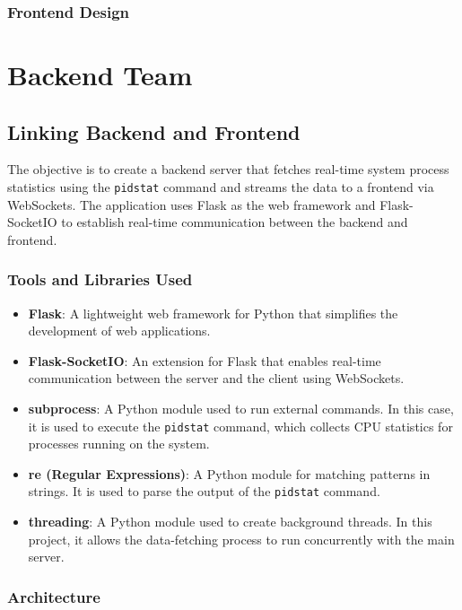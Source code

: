 \documentclass[12pt]{article}
\begin{document}
\subsubsection{Frontend Design}
\section{Backend Team}
\subsection{Linking Backend and Frontend}
The objective is to create a backend server that fetches real-time system process statistics using the \texttt{pidstat} command and streams the data to a frontend via WebSockets. The application uses Flask as the web framework and Flask-SocketIO to establish real-time communication between the backend and frontend.

\subsubsection{Tools and Libraries Used}

\begin{itemize}
    \item \textbf{Flask}: A lightweight web framework for Python that simplifies the development of web applications.
    \item \textbf{Flask-SocketIO}: An extension for Flask that enables real-time communication between the server and the client using WebSockets.
    \item \textbf{subprocess}: A Python module used to run external commands. In this case, it is used to execute the \texttt{pidstat} command, which collects CPU statistics for processes running on the system.
    \item \textbf{re (Regular Expressions)}: A Python module for matching patterns in strings. It is used to parse the output of the \texttt{pidstat} command.
    \item \textbf{threading}: A Python module used to create background threads. In this project, it allows the data-fetching process to run concurrently with the main server.
\end{itemize}

\subsubsection{Architecture}
\end{document}
